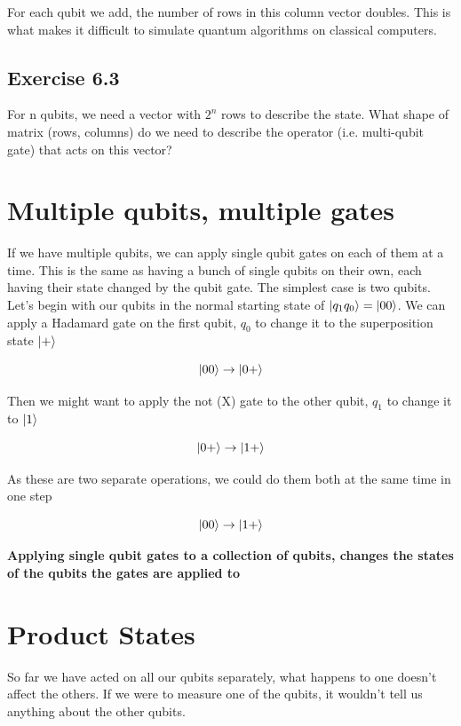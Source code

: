 \documentclass{book}
\begin{document}
For each qubit we add, the number of rows in this column vector doubles. This is what makes it difficult to simulate quantum algorithms on classical computers. \newline



\subsection{Exercise 6.3}

For n qubits, we need a vector with $2^n$ rows to describe the state. What shape of matrix (rows, columns) do we need to describe the operator (i.e. multi-qubit gate) that acts on this vector? \newline



\section{ Multiple qubits, multiple gates }


If we have multiple qubits, we can apply single qubit gates on each of them at a time. This is the same as having a bunch of single qubits on their own, each having their state changed by the qubit gate. The simplest case is two qubits. Let's begin with our qubits in the normal starting state of $\ket{q_1q_0} = \ket{00}$. We can apply a Hadamard gate on the first qubit, $q_0$ to change it to the superposition state $\ket{+}$

$$ \ket{00} \rightarrow \ket{0+} $$ 

Then we might want to apply the not (X) gate to the other qubit, $q_1$ to change it to $\ket{1}$

$$ \ket{0+} \rightarrow \ket{1+} $$

As these are two separate operations, we could do them both at the same time in one step 

$$  \ket{00} \rightarrow \ket{1+} $$

\textbf{Applying single qubit gates to a collection of qubits, changes the states of the qubits the gates are applied to}


\section{ Product States }

So far we have acted on all our qubits separately, what happens to one doesn't affect the others. If we were to measure one of the qubits, it wouldn't tell us anything about the other qubits. 
\end{document}
